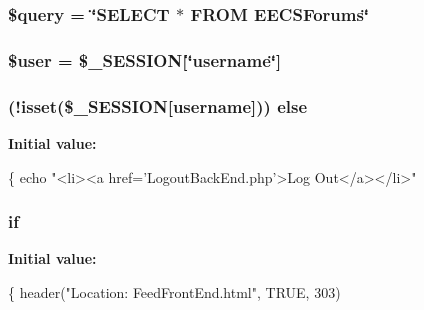 \subsubsection[{\texorpdfstring{\$query}{$query}}]{\setlength{\rightskip}{0pt plus 5cm}\$query = \char`\"{}S\+E\+L\+E\+CT $\ast$ F\+R\+OM E\+E\+C\+S\+Forums\char`\"{}}\hypertarget{_display_links_8php_af59a5f7cd609e592c41dc3643efd3c98}{}\label{_display_links_8php_af59a5f7cd609e592c41dc3643efd3c98}
\subsubsection[{\texorpdfstring{\$user}{$user}}]{\setlength{\rightskip}{0pt plus 5cm}\$user = \$\+\_\+\+S\+E\+S\+S\+I\+ON\mbox{[}\char`\"{}username\char`\"{}\mbox{]}}\hypertarget{_display_links_8php_a598ca4e71b15a1313ec95f0df1027ca5}{}\label{_display_links_8php_a598ca4e71b15a1313ec95f0df1027ca5}
\subsubsection[{\texorpdfstring{else}{else}}]{ (!isset(\$\+\_\+\+S\+E\+S\+S\+I\+ON\mbox{[}\textquotesingle{}username\textquotesingle{}\mbox{]})) else}\hypertarget{_display_links_8php_a8691f3cba8478e398368302e5f0cb89b}{}\label{_display_links_8php_a8691f3cba8478e398368302e5f0cb89b}
{\bfseries Initial value\+:}
\begin{DoxyCode}
\{
  echo \textcolor{stringliteral}{"<li><a href='LogoutBackEnd.php'>Log Out</a></li>"}
\end{DoxyCode}
\subsubsection[{\texorpdfstring{if}{if}}]{\setlength{\rightskip}{0pt plus 5cm}if}\hypertarget{_display_links_8php_aba19ca87a8222f9588fd377feafe258e}{}\label{_display_links_8php_aba19ca87a8222f9588fd377feafe258e}
{\bfseries Initial value\+:}
\begin{DoxyCode}
\{
  header(\textcolor{stringliteral}{"Location: FeedFrontEnd.html"}, TRUE, 303)
\end{DoxyCode}
